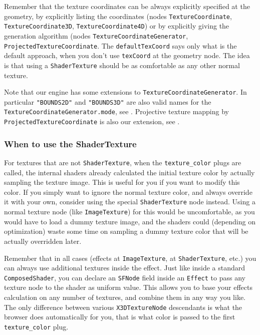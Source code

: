 \documentclass{acmsiggraph}                     %
\begin{document}
Remember that the texture coordinates can be always explicitly specified
at the geometry, by explicitly listing the coordinates (nodes
\texttt{TextureCoordinate}, \texttt{TextureCoordinate3D},
\texttt{TextureCoordinate4D}) or by explicitly giving the generation
algorithm (nodes \texttt{TextureCoordinateGenerator},
\texttt{ProjectedTextureCoordinate}.
The \texttt{defaultTexCoord} says only what is the default approach,
when you don't use \texttt{texCoord} at the geometry node.
The idea is that using a \texttt{ShaderTexture} should be as comfortable
as any other normal texture.

Note that our engine has some extensions to \texttt{TextureCoordinateGenerator}.
In particular \texttt{"BOUNDS2D"} and \texttt{"BOUNDS3D"} are also valid names
for the \texttt{TextureCoordinateGenerator.mode}, see
\cite{vrmleng:texcoordbounds}.
Projective texture mapping by \texttt{ProjectedTextureCoordinate}
is also our extension, see \cite{vrmleng:projectivetexturing}.

\subsubsection{When to use the ShaderTexture}

For textures that are not \texttt{ShaderTexture},
when the \texttt{texture\_color} plugs are called,
the internal shaders already calculated the initial texture
color by actually sampling the texture image. This is useful for you if you
want to modify this color. If you simply want to ignore the normal
texture color, and always override it with your own, consider using
the special \texttt{ShaderTexture} node instead. Using
a normal texture node (like \texttt{ImageTexture}) for this
would be uncomfortable, as you would have to load a dummy texture image,
and the shaders could (depending on optimization) waste some time
on sampling a dummy texture color that will be actually overridden later.

Remember that in all cases (effects at \texttt{ImageTexture},
at \texttt{ShaderTexture}, etc.) you can always use additional
textures inside the effect. Just like inside a standard \texttt{ComposedShader},
you can declare an \texttt{SFNode} field inside an \texttt{Effect}
to pass any texture node to the shader as uniform value.
This allows you to base your effects calculation on any number of textures,
and combine them in any way you like. The only difference
between various \texttt{X3DTextureNode} descendants is what the browser
does automatically for you, that is what color is passed
to the first \texttt{texture\_color} plug.
\end{document}

